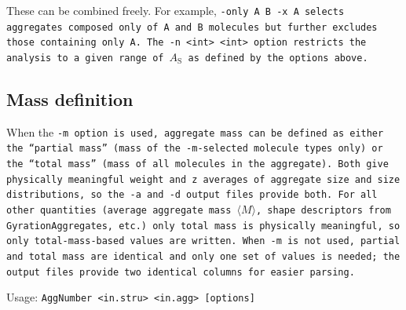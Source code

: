 These can be combined freely. For example, \tt{-only A B -x A} selects
aggregates composed only of \tt{A} and \tt{B} molecules but further excludes
those containing only \tt{A}. The \tt{-n <int> <int>} option restricts the
analysis to a given range of $A_\text{S}$ as defined by the options above.

\subsection{Mass definition} \label{subsec:AggNumber-mass}

When the \tt{-m} option is used, aggregate mass can be defined as either the
\enquote{partial mass} (mass of the \tt{-m}-selected molecule types only) or
the \enquote{total mass} (mass of all molecules in the aggregate). Both give
physically meaningful weight and z averages of aggregate size and size
distributions, so the \tt{-a} and \tt{-d} output files provide both. For all
other quantities (average aggregate mass $\langle M\rangle$, shape descriptors
from \tt{GyrationAggregates}, etc.) only total mass is physically meaningful, so
only total-mass-based values are written. When \tt{-m} is not used, partial and
total mass are identical and only one set of values is needed; the output files
provide two identical columns for easier parsing.



\vspace{1em}
\noindent
Usage: \tt{AggNumber <in.stru> <in.agg> [options]}

